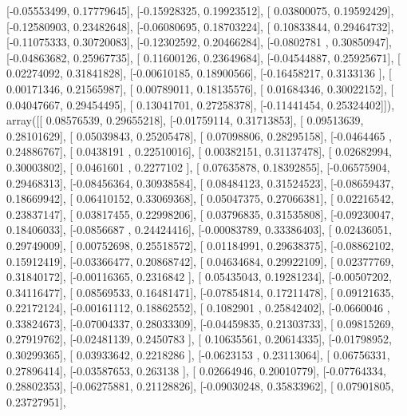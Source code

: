 \documentclass{article}
\begin{document}
       [-0.05553499,  0.17779645],
       [-0.15928325,  0.19923512],
       [ 0.03800075,  0.19592429],
       [-0.12580903,  0.23482648],
       [-0.06080695,  0.18703224],
       [ 0.10833844,  0.29464732],
       [-0.11075333,  0.30720083],
       [-0.12302592,  0.20466284],
       [-0.0802781 ,  0.30850947],
       [-0.04863682,  0.25967735],
       [ 0.11600126,  0.23649684],
       [-0.04544887,  0.25925671],
       [ 0.02274092,  0.31841828],
       [-0.00610185,  0.18900566],
       [-0.16458217,  0.3133136 ],
       [ 0.00171346,  0.21565987],
       [ 0.00789011,  0.18135576],
       [ 0.01684346,  0.30022152],
       [ 0.04047667,  0.29454495],
       [ 0.13041701,  0.27258378],
       [-0.11441454,  0.25324402]]), array([[ 0.08576539,  0.29655218],
       [-0.01759114,  0.31713853],
       [ 0.09513639,  0.28101629],
       [ 0.05039843,  0.25205478],
       [ 0.07098806,  0.28295158],
       [-0.0464465 ,  0.24886767],
       [ 0.0438191 ,  0.22510016],
       [ 0.00382151,  0.31137478],
       [ 0.02682994,  0.30003802],
       [ 0.0461601 ,  0.2277102 ],
       [ 0.07635878,  0.18392855],
       [-0.06575904,  0.29468313],
       [-0.08456364,  0.30938584],
       [ 0.08484123,  0.31524523],
       [-0.08659437,  0.18669942],
       [ 0.06410152,  0.33069368],
       [ 0.05047375,  0.27066381],
       [ 0.02216542,  0.23837147],
       [ 0.03817455,  0.22998206],
       [ 0.03796835,  0.31535808],
       [-0.09230047,  0.18406033],
       [-0.0856687 ,  0.24424416],
       [-0.00083789,  0.33386403],
       [ 0.02436051,  0.29749009],
       [ 0.00752698,  0.25518572],
       [ 0.01184991,  0.29638375],
       [-0.08862102,  0.15912419],
       [-0.03366477,  0.20868742],
       [ 0.04634684,  0.29922109],
       [ 0.02377769,  0.31840172],
       [-0.00116365,  0.2316842 ],
       [ 0.05435043,  0.19281234],
       [-0.00507202,  0.34116477],
       [ 0.08569533,  0.16481471],
       [-0.07854814,  0.17211478],
       [ 0.09121635,  0.22172124],
       [-0.00161112,  0.18862552],
       [ 0.1082901 ,  0.25842402],
       [-0.0660046 ,  0.33824673],
       [-0.07004337,  0.28033309],
       [-0.04459835,  0.21303733],
       [ 0.09815269,  0.27919762],
       [-0.02481139,  0.2450783 ],
       [ 0.10635561,  0.20614335],
       [-0.01798952,  0.30299365],
       [ 0.03933642,  0.2218286 ],
       [-0.0623153 ,  0.23113064],
       [ 0.06756331,  0.27896414],
       [-0.03587653,  0.263138  ],
       [ 0.02664946,  0.20010779],
       [-0.07764334,  0.28802353],
       [-0.06275881,  0.21128826],
       [-0.09030248,  0.35833962],
       [ 0.07901805,  0.23727951],
\end{document}
